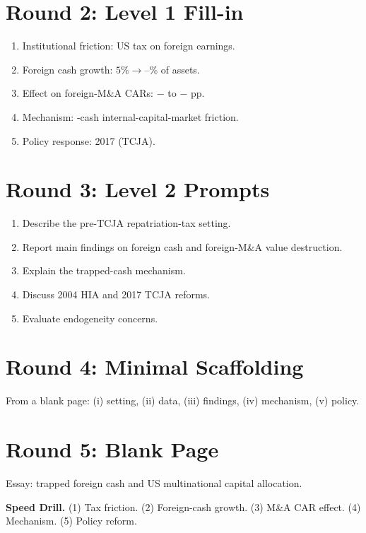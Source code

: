 \documentclass[11pt]{article}
\newcommand{\blank}[1]{\underline{\hspace{#1}}}
\begin{document}
\section*{Round 2: Level 1 Fill-in}
\begin{enumerate}
\item Institutional friction: US \blank{2cm} tax on foreign earnings.
\item Foreign cash growth: $5\%\to$\blank{1cm}--\blank{1cm}\% of assets.
\item Effect on foreign-M\&A CARs: $-$\blank{1cm} to $-$\blank{1cm} pp.
\item Mechanism: \blank{2cm}-cash internal-capital-market friction.
\item Policy response: \blank{2cm} 2017 (TCJA).
\end{enumerate}

\section*{Round 3: Level 2 Prompts}
\begin{enumerate}
\item Describe the pre-TCJA repatriation-tax setting.
\item Report main findings on foreign cash and foreign-M\&A value destruction.
\item Explain the trapped-cash mechanism.
\item Discuss 2004 HIA and 2017 TCJA reforms.
\item Evaluate endogeneity concerns.
\end{enumerate}

\section*{Round 4: Minimal Scaffolding}
From a blank page: (i) setting, (ii) data, (iii) findings, (iv) mechanism, (v) policy.

\section*{Round 5: Blank Page}
Essay: trapped foreign cash and US multinational capital allocation.

\vspace{6pt}
\begin{drillbox}
\textbf{Speed Drill.} (1) Tax friction. (2) Foreign-cash growth. (3) M\&A CAR effect. (4) Mechanism. (5) Policy reform.
\end{drillbox}
\end{document}
